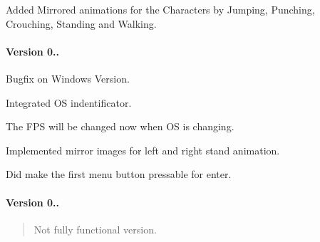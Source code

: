 Added Mirrored animations for the Characters by Jumping, Punching, Crouching, Standing and Walking.

\paragraph*{Version 0..}

Bugfix on Windows Version.

Integrated O\+S indentificator.

The F\+P\+S will be changed now when O\+S is changing.

Implemented mirror images for left and right stand animation.

Did make the first menu button pressable for enter.

\paragraph*{Version 0..}

\begin{quote}
Not fully functional version.\end{quote}
